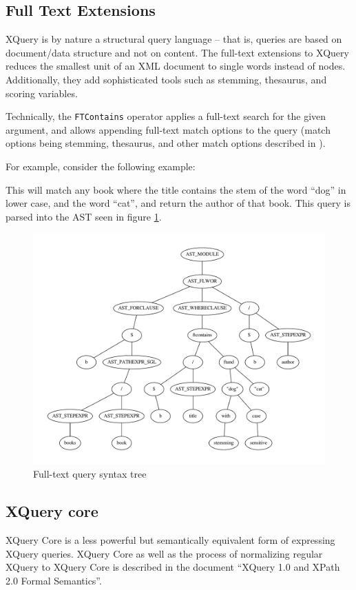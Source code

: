 \subsection{Full Text Extensions}
\label{sect:theory:xquery:fulltext_ext}
XQuery is by nature a structural query language -- that is, queries are based on
document/data structure and not on content. The full-text extensions to XQuery
reduces the smallest unit of an XML document to single words instead of nodes.
Additionally, they add sophisticated tools such as stemming, thesaurus, and
scoring variables.

Technically, the \verb!FTContains! operator applies a full-text search for the
given argument, and allows appending full-text match options to the query
(match options being stemming, thesaurus, and other match options described in
\cite{w3c01}).

For example, consider the following example:

This will match any book where the title contains the stem of the word ``dog'' in
lower case, and the word ``cat'', and return the author of that book. This
query is parsed into the AST seen in figure \ref{figure:xquery:full_text_ast}.

\begin{figure}[h]
  \centering
    \includegraphics[scale=0.50]{img/graphs/ftq1} 
  \caption{Full-text query syntax tree}
  \label{figure:xquery:full_text_ast}
\end{figure}

\subsection{XQuery core}
\label{sect:theory:xquery:XQcore}
XQuery Core is a less powerful but semantically equivalent form of expressing
XQuery queries. XQuery Core as well as the process of normalizing regular
XQuery to XQuery Core is described in the document ``XQuery 1.0 and XPath 2.0
Formal Semantics''\cite{xquery_semantics}.

